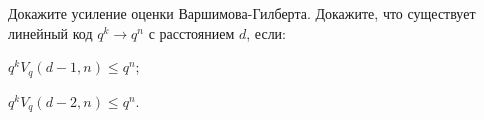 Докажите усиление оценки Варшимова-Гилберта. Докажите, что существует линейный код $q^k \to q^n$ с расстоянием $d$, если:
\begin{enumcyr}
    \item $q^k V_q(d - 1, n) \le q^n$;
    \item $q^k V_q(d - 2, n) \le q^n$.
\end{enumcyr}